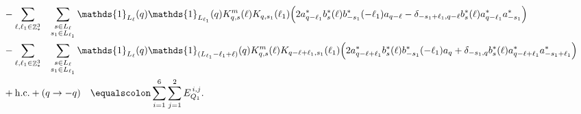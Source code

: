 \documentclass[sn-mathphys, Numbered ,a4paper]{sn-jnl}%
\DeclareMathOperator{\Z}{\mathbb{Z}}
\theoremstyle{plain}
\theoremstyle{definition}
\theoremstyle{remark}
\theoremstyle{plain}
\theoremstyle{definition}
\theoremstyle{remark}
\begin{document}
\begin{alignat}{2}
    &- \sum\limits_{\ell, \ell_1\in \Z^3_*} \!\quad \sum\limits_{ \substack{s \in     L_{\ell} \\ s_1\in L_{\ell_1}}} \mathds{1}_{L_\ell}(q)                        \mathds{1}_{L_{\ell_1}}(q) K^{m}_{q,s}(\ell) K_{q,s_1}(\ell_1) \Big(          2a^*_{q-\ell_1} b^*_{s}(\ell) b^*_{-s_1}(-\ell_1) a_{q-\ell} - \delta_{-      s_1+\ell_1,q-\ell} b^*_{s}(\ell) a^*_{q-\ell_1} a^*_{-s_1}                  \Big)\nonumber\\
    &-\sum\limits_{\ell, \ell_1\in \Z^3_*}  \!\quad                      
        \sum\limits_{\substack{s \in L_{\ell} \\ s_1 \in L_{\ell_1}}}\!\,  \mathds{1}_{L_\ell}(q) \mathds{1}_{(L_{\ell_1}-\ell_1+\ell)}(q) K^{m}_{q,s}(\ell) K_{q-\ell+\ell_1,s_1}(\ell_1)\Big( 2a^*_{q-\ell+\ell_1} b^*_{s}(\ell) b^*_{-s_1}(-\ell_1) a_{q} + \delta_{-s_1,q} b^*_{s}(\ell) a^*_{q-\ell+\ell_1}a^*_{-s_1+\ell_1}\Big)
        \nonumber\\
    &+\mathrm{h.c.} + (q\rightarrow-q) \quad\equalscolon \sum\limits_{i=1}^{6}\sum\limits_{j=1}^{2} E_{Q_1}^{\,i,j}\nonumber.
\end{alignat}
\end{document}
